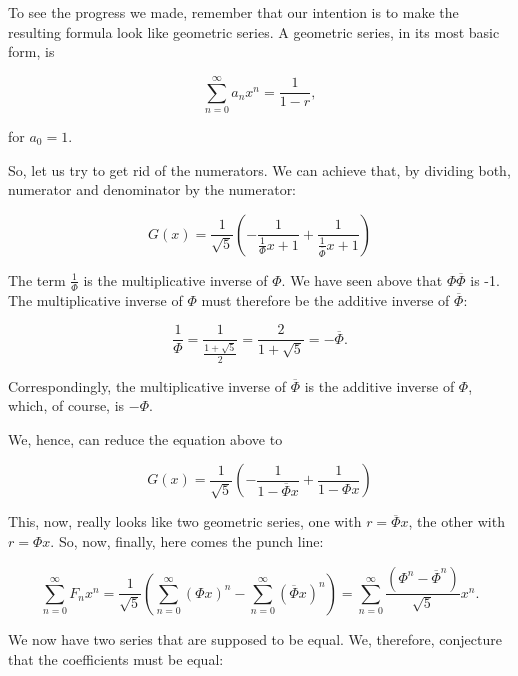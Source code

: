 \documentclass[tikz]{scrreprt}
\begin{document}
To see the progress we made, remember that our intention is
to make the resulting formula look like geometric series.
A geometric series, in its most basic form, is

\begin{equation}
\sum_{n=0}^{\infty}{a_nx^n} = \frac{1}{1-r},
\end{equation}

for $a_0 = 1$.

So, let us try to get rid of the numerators.
We can achieve that, by dividing both,
numerator and denominator by the numerator:

\begin{equation}
G(x) = \frac{1}{\sqrt{5}}\left(
       -\frac{1}{\frac{1}{\Phi}x+1} + 
       \frac{1}{\frac{1}{\overline{\Phi}}x+1}\right)
\end{equation}

The term $\frac{1}{\Phi}$ is the multiplicative inverse of $\Phi$.
We have seen above that $\Phi\overline{\Phi}$ is -1.
The multiplicative inverse of $\Phi$ must therefore be
the additive inverse of $\overline{\Phi}$:

\begin{equation}
\frac{1}{\Phi} = \frac{1}{\frac{1+\sqrt{5}}{2}} =
\frac{2}{1+\sqrt{5}} = -\overline{\Phi}.
\end{equation}

Correspondingly, the multiplicative inverse of $\overline{\Phi}$
is the additive inverse of $\Phi$, which, of course, is $-\Phi$.

We, hence, can reduce the equation above to

\begin{equation}
G(x) = \frac{1}{\sqrt{5}}\left(
       -\frac{1}{1-\overline{\Phi}x} + 
       \frac{1}{1-{\Phi}x}\right)
\end{equation}

This, now, really looks like two geometric series,
one with $r = \overline{\Phi}x$,
the other with $r = \Phi x$.
So, now, finally, here comes the punch line:

\begin{equation}
\sum_{n=0}^{\infty}{F_nx^n} =
\frac{1}{\sqrt{5}}\left(
\sum_{n=0}^{\infty}{(\Phi x)^n} -
\sum_{n=0}^{\infty}{(\overline{\Phi}x)^n}\right) =
\sum_{n=0}^{\infty}{\frac{(\Phi^n - \overline{\Phi}^n)}{\sqrt{5}}x^n}.
\end{equation}

We now have two series that are supposed to be equal.
We, therefore, conjecture that the coefficients must be equal:
\end{document}
